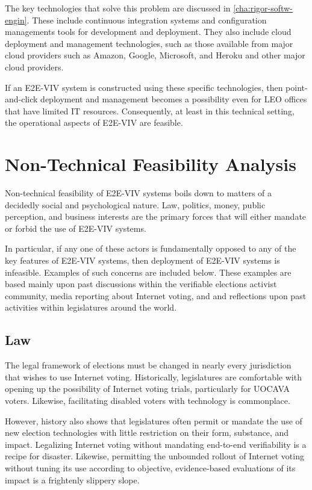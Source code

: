 The key technologies that solve this problem are discussed in
\autoref{cha:rigor-softw-engin}.  These include continuous integration
systems and configuration managements tools for development and
deployment.  They also include cloud deployment and management
technologies, such as those available from major cloud providers such
as Amazon, Google, Microsoft, and Heroku and other major cloud
providers.

If an E2E-VIV system is constructed using these specific technologies,
then point-and-click deployment and management becomes a possibility
even for LEO offices that have limited IT resources.  Consequently, at
least in this technical setting, the operational aspects of E2E-VIV
are feasible.

\section{Non-Technical Feasibility Analysis}

Non-technical feasibility of E2E-VIV systems boils down to matters of
a decidedly social and psychological nature.  Law, politics, money,
public perception, and business interests are the primary forces that
will either mandate or forbid the use of E2E-VIV systems.

In particular, if any one of these actors is fundamentally opposed to
any of the key features of E2E-VIV systems, then deployment of E2E-VIV
systems is infeasible. Examples of such concerns are included below.
These examples are based mainly upon past discussions within the
verifiable elections activist community, media reporting about
Internet voting, and and reflections upon past activities within
legislatures around the world.

\subsection{Law}

The legal framework of elections must be changed in nearly every
jurisdiction that wishes to use Internet voting.  Historically,
legislatures are comfortable with opening up the possibility of
Internet voting trials, particularly for UOCAVA voters.  Likewise,
facilitating disabled voters with technology is commonplace.

However, history also shows that legislatures often permit or mandate
the use of new election technologies with little restriction on their
form, substance, and impact.  Legalizing Internet voting without
mandating end-to-end verifiability is a recipe for disaster.
Likewise, permitting the unbounded rollout of Internet voting without
tuning its use according to objective, evidence-based evaluations of
its impact is a frightenly slippery slope.

